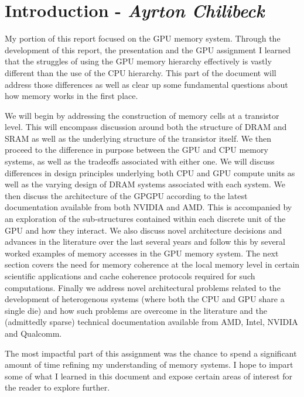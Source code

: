 \section{Introduction - \textit{Ayrton Chilibeck}}

My portion of this report focused on the GPU memory system. Through the development of this report, the presentation and the GPU assignment I learned that the struggles of using the GPU memory hierarchy effectively is vastly different than the use of the CPU hierarchy. This part of the document will address those differences as well as clear up some fundamental questions about how memory works in the first place. 

We will begin by addressing the construction of memory cells at a transistor level. This will encompass discussion around both the structure of DRAM and SRAM as well as the underlying structure of the transistor itself. We then proceed to the difference in purpose between the GPU and CPU memory systems, as well as the tradeoffs associated with either one. We will discuss differences in design principles underlying both CPU and GPU compute units as well as the varying design of DRAM systems associated with each system. We then discuss the architecture of the GPGPU according to the latest documentation available from both NVIDIA and AMD. This is accompanied by an exploration of the sub-structures contained within each discrete unit of the GPU and how they interact. We also discuss novel architecture decisions and advances in the literature over the last several years and follow this by several worked examples of memory accesses in the GPU memory system. The next section covers the need for memory coherence at the local memory level in certain scientific applications and cache coherence protocols required for such computations. Finally we address novel architectural problems related to the development of heterogenous systems (where both the CPU and GPU share a single die) and how such problems are overcome in the literature and the (admittedly sparse) technical documentation available from AMD, Intel, NVIDIA and Qualcomm.

The most impactful part of this assignment was the chance to spend a significant amount of time refining my understanding of memory systems. I hope to impart some of what I learned in this document and expose certain areas of interest for the reader to explore further.
